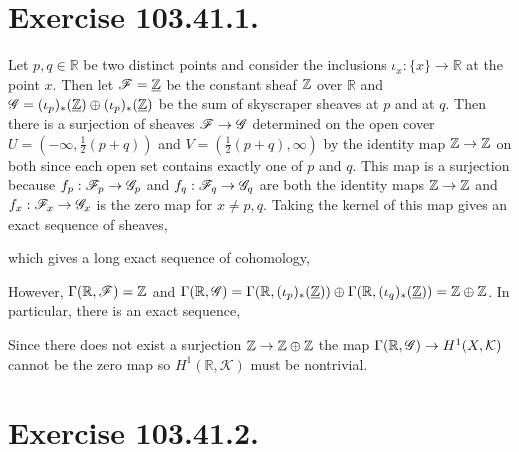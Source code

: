 \documentclass[12pt]{article}
\begin{document}

\section{Exercise 103.41.1.}

\newcommand{\R}{\mathbb{R}}

Let $p, q \in \R$ be two distinct points and consider the inclusions $\iota_x : \{ x \} \to \R$ at the point $x$. Then let $\mathscr{F} = \underline{\mathbb{Z}}$ be the constant sheaf $\mathbb{Z}$ over $\R$ and $\mathscr{G} = (\iota_p)_*(\underline{\mathbb{Z}}) \oplus (\iota_p)_*(\underline{\mathbb{Z}})$ be the sum of skyscraper sheaves at $p$ and at $q$. Then there is a surjection of sheaves $\mathscr{F} \to \mathscr{G}$ determined on the open cover $U = (-\infty, \tfrac{1}{2}(p + q))$ and $V = (\tfrac{1}{2}(p + q), \infty)$ by the identity map $\mathbb{Z} \to \mathbb{Z}$ on both since each open set contains exactly one of $p$ and $q$. This map is a surjection because $f_p : \mathscr{F}_p \to \mathscr{G}_p$ and $f_q : \mathscr{F}_q \to \mathscr{G}_q$ are both the identity maps $\mathbb{Z} \to \mathbb{Z}$ and $f_x : \mathscr{F}_x \to \mathscr{G}_x$ is the zero map for $x \neq p,q$. Taking the kernel of this map gives an exact sequence of sheaves,
\begin{center}
\end{center}
which gives a long exact sequence of cohomology,
\begin{center}
\end{center}
However, $\Gamma(\R, \F) = \Z$ and $\Gamma(\R, \G) = \Gamma(\R, (\iota_p)_*(\underline{\Z})) \oplus \Gamma(\R, (\iota_q)_*(\underline{\Z})) = \Z \oplus \Z$. In particular, there is an exact sequence,
\begin{center}
\end{center}
Since there does not exist a surjection $\mathbb{Z} \to \mathbb{Z} \oplus \mathbb{Z}$ the map $\Gamma(\R, \G) \to H^1(X, \mathcal{K})$ cannot be the zero map so $H^1(\R, \mathcal{K})$ must be nontrivial. 

\section{Exercise 103.41.2.}
\end{document}
